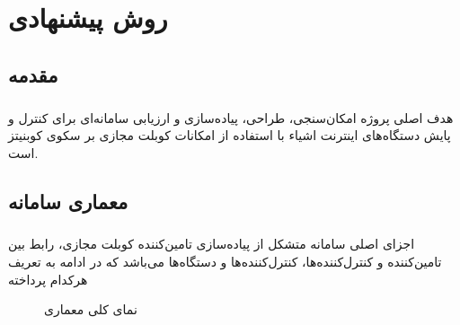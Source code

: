
\chapter{روش پیشنهادی} \label{ch:method}
\thispagestyle{empty}

\section{مقدمه}
\paragraph{}{
    هدف اصلی پروژه امکان‌سنجی، طراحی، پیاده‌سازی و ارزیابی سامانه‌ای برای کنترل و پایش دستگاه‌های اینترنت اشیاء با استفاده از امکانات کوبلت مجازی بر سکوی کوبنیتز است.
}

\section{معماری سامانه}
\paragraph{}{
    اجزای اصلی سامانه متشکل از پیاده‌سازی تامین‌کننده کوبلت مجازی، رابط بین تامین‌کننده و کنترل‌کننده‌ها، کنترل‌کننده‌ها و دستگاه‌ها می‌باشد که در ادامه به تعریف هرکدام پرداخته
    \begin{figure}[H]
        \caption{نمای کلی معماری}
        \label{fig:arch}
    \end{figure}
}

